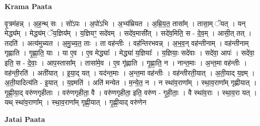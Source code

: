 \documentclass[17pt]{extarticle}
\begin{document}
\textbf{Krama Paata} \newline

वृ॒त्रम॑हन्न् । अ॒ह॒न्थ् सः । सो॑ऽपः । अ॒पो॑ऽभि । अ॒भ्य॑म्रियत । अ॒म्रि॒य॒त॒ तासा᳚म् । तासा॒म् ॅयत् । यन् मेद्ध्य᳚म् । मेद्ध्य॑म् ॅय॒ज्ञिय᳚म् । य॒ज्ञियꣳ॒॒ सदे॑वम् । सदे॑व॒मासी᳚त् । सदे॑व॒मिति॒ स - दे॒व॒म् । आसी॒त् तत् । तदति॑ । अत्य॑मुच्यत । अ॒मु॒च्य॒त॒ ताः । ता वह॑न्तीः । वह॑न्तिरभवन्न् । अ॒भ॒व॒न् वह॑न्तीनाम् । वह॑न्तीनाम् गृह्णाति । गृ॒ह्णा॒ति॒ याः । या ए॒व । ए॒व मेद्ध्याः᳚ । मेद्ध्या॑ य॒ज्ञियाः᳚ । य॒ज्ञियाः॒ सदे॑वाः । सदे॑वा॒ आपः॑ । सदे॑वा॒ इति॒ स - दे॒वाः॒ । आप॒स्तासा᳚म् । तासा॑मे॒व । ए॒व गृ॑ह्णाति । गृ॒ह्णा॒ति॒ न । नान्त॒माः । अ॒न्त॒मा वह॑न्तीः । वह॑न्ती॒रति॑ । अती॑यात् । इ॒या॒द् यत् । यद॑न्त॒माः । अ॒न्त॒मा वह॑न्तीः । वह॑न्तीरती॒यात् । अ॒ती॒याद् य॒ज्ञ्म् । अ॒ती॒यादित्य॑ति - इ॒यात् । य॒ज्ञ्मति॑ । अति॑ मन्येत । म॒न्ये॒त॒ न । न स्था॑व॒राणा᳚म् । स्था॒व॒राणा᳚म् गृह्णीयात् । गृ॒ह्णी॒या॒द् वरु॑णगृहीताः । वरु॑णगृहीता॒ वै । वरु॑णगृहीता॒ इति॒ वरु॑ण - गृ॒ही॒ताः॒ । वै स्था॑व॒राः । स्था॒व॒रा यत् । यथ् स्था॑व॒राणा᳚म् । स्था॒व॒राणा᳚म् गृह्णी॒यात् । गृ॒ह्णी॒याद् वरु॑णेन \newline

\textbf{Jatai Paata} \newline
\end{document}
